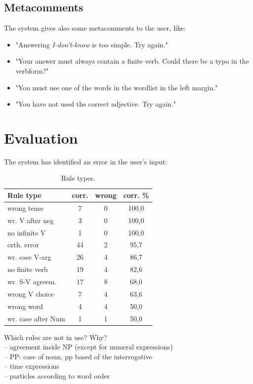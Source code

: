 \documentclass[11pt]{article}
\begin{document}
\subsection{Metacomments}
The system gives also some metacomments to the user, like:
\begin{itemize}
\setlength{\itemsep}{-0.2cm}
\item "Answering \textit{I-don't-know} is too simple. Try again."
\item "Your answer must always contain a finite verb. Could there be a typo in the verbform?"
\item "You must use one of the words in the wordlist in the left margin."
\item "You have not used the correct adjective. Try again."
\end{itemize}



\section{Evaluation}
 
The system has identified an error in the user's input:
\begin{table}[htbp]
\begin{tabular}{|l|c|c|c|}
\hline 
\textbf{Rule type}  & \textbf{corr.} & \textbf{wrong}   & \textbf{corr. \% }  \\
\hline 
wrong tense         & 7     & 0     & 100,0     \\ 
wr. V after neg   & 3     & 0     & 100,0     \\ 
no infinite V       & 1     & 0     & 100,0     \\ 
\hline 
orth. error         & 44    & 2     & 95,7      \\
wr. case V-arg  & 26    & 4     & 86,7      \\
no finite verb        & 19    & 4     &  82,6 \\
\hline 
wr. S-V agreem.   & 17    & 8     & 68,0 \\
wrong V choice        & 7     & 4     & 63,6 \\
\hline 
wrong word            & 4     & 4     & 50,0 \\
wr. case after Num  & 1     & 1     & 50,0 \\
\hline
\end{tabular}
\caption{Rule types.}
\label{ruletypes}
\end{table}


Which rules are not in use? Why? \\
-- agreement inside NP (except for numeral expressions) \\
-- PP: case of noun, pp based of the interrogative  \\
-- time expressions \\
-- particles according to word order \\
\end{document}
